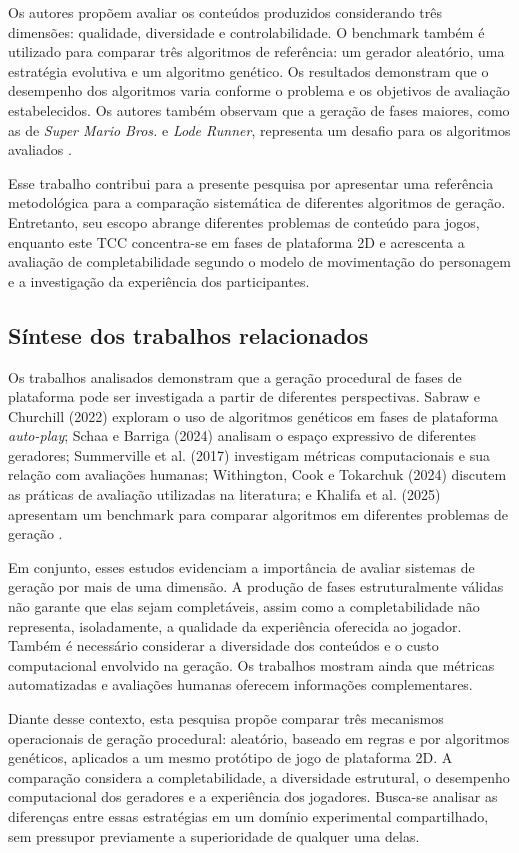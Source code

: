 Os autores propõem avaliar os conteúdos produzidos considerando 
três dimensões: qualidade, diversidade e controlabilidade. O benchmark 
também é utilizado para comparar três algoritmos de referência: 
um gerador aleatório, uma estratégia evolutiva e um algoritmo genético. 
Os resultados demonstram que o desempenho dos algoritmos varia conforme 
o problema e os objetivos de avaliação estabelecidos. Os autores também 
observam que a geração de fases maiores, como as de \textit{Super Mario Bros.}
e \textit{Lode Runner}, representa um desafio para os algoritmos avaliados
\cite{Khalifa2025}.

Esse trabalho contribui para a presente pesquisa por apresentar uma 
referência metodológica para a comparação sistemática de diferentes
algoritmos de geração. Entretanto, seu escopo abrange diferentes problemas 
de conteúdo para jogos, enquanto este TCC concentra-se em fases de 
plataforma 2D e acrescenta a avaliação de completabilidade segundo o modelo 
de movimentação do personagem e a investigação da experiência dos 
participantes.

\subsection{Síntese dos trabalhos relacionados}

Os trabalhos analisados demonstram que a geração procedural de fases 
de plataforma pode ser investigada a partir de diferentes perspectivas. 
Sabraw e Churchill (2022) exploram o uso de algoritmos genéticos em
fases de plataforma \textit{auto-play}; Schaa e Barriga (2024) analisam o
espaço expressivo de diferentes geradores; Summerville et al. (2017) 
investigam métricas computacionais e sua relação com avaliações
humanas; Withington, Cook e Tokarchuk (2024) discutem as práticas de 
avaliação utilizadas na literatura; e Khalifa et al. (2025) apresentam
um benchmark para comparar algoritmos em diferentes problemas de geração 
\cite{SabrawChurchill2022,SchaaBarriga2024,Summerville2017,Withington2024,Khalifa2025}.

Em conjunto, esses estudos evidenciam a importância de avaliar sistemas 
de geração por mais de uma dimensão. A produção de fases estruturalmente 
válidas não garante que elas sejam completáveis, assim como a completabilidade
não representa, isoladamente, a qualidade da experiência oferecida ao jogador. 
Também é necessário considerar a diversidade dos conteúdos e o custo 
computacional envolvido na geração. Os trabalhos mostram ainda que métricas 
automatizadas e avaliações humanas oferecem informações complementares.

Diante desse contexto, esta pesquisa propõe comparar três mecanismos 
operacionais de geração procedural: aleatório, baseado em regras e por 
algoritmos genéticos, aplicados a um mesmo protótipo de jogo de plataforma 2D.
A comparação considera a completabilidade, a diversidade estrutural, o 
desempenho computacional dos geradores e a experiência dos jogadores. 
Busca-se analisar as diferenças entre essas estratégias em um domínio
experimental compartilhado, sem pressupor previamente a superioridade de 
qualquer uma delas.
